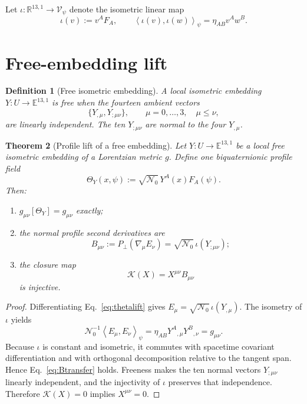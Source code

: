 \documentclass[11pt,a4paper]{article}
\newtheorem{definition}{Definition}[section]
\newtheorem{theorem}[definition]{Theorem}
\theoremstyle{remark}
\newcommand{\Nzero}{\mathcal N_0}
\newcommand{\avg}[1]{\left\langle #1\right\rangle_\psi}
\begin{document}
Let $\iota:\mathbb R^{13,1}\to\mathscr V_\psi$ denote the isometric linear map
\[
 \iota(v):=v^A F_A,
 \qquad
 \avg{\iota(v),\iota(w)}=\eta_{AB}v^Aw^B.
\]

\section{Free-embedding lift}

\begin{definition}[Free isometric embedding]
A local isometric embedding $Y:U\to\mathbb E^{13,1}$ is free when the fourteen
ambient vectors
\begin{equation}
 \{Y_{,\mu},Y_{;\mu\nu}\},
 \qquad \mu=0,\ldots,3,\quad \mu\le\nu,
 \label{eq:freevectors}
\end{equation}
are linearly independent.  The ten $Y_{;\mu\nu}$ are normal to the four
$Y_{,\mu}$.
\end{definition}

\begin{theorem}[Profile lift of a free embedding]
Let $Y:U\to\mathbb E^{13,1}$ be a local free isometric embedding of a
Lorentzian metric $g$.  Define one biquaternionic profile field
\begin{equation}
 \boxed{\quad
 \Theta_Y(x,\psi):=\sqrt{\Nzero}\,Y^A(x)F_A(\psi).
 \quad}
 \label{eq:thetalift}
\end{equation}
Then:
\begin{enumerate}
 \item $g_{\mu\nu}[\Theta_Y]=g_{\mu\nu}$ exactly;
 \item the normal profile second derivatives are
 \begin{equation}
  B_{\mu\nu}
  :=P_\perp(\nabla_\mu E_\nu)
  =\sqrt{\Nzero}\,\iota(Y_{;\mu\nu});
  \label{eq:Btransfer}
 \end{equation}
 \item the closure map
 \begin{equation}
  \mathcal K(X)=X^{\mu\nu}B_{\mu\nu}
  \label{eq:Kmap}
 \end{equation}
 is injective.
\end{enumerate}
\end{theorem}

\begin{proof}
Differentiating Eq.~\eqref{eq:thetalift} gives
$E_\mu=\sqrt{\Nzero}\,\iota(Y_{,\mu})$.  The isometry of $\iota$ yields
\[
 \Nzero^{-1}\avg{E_\mu,E_\nu}
 =\eta_{AB}Y^A{}_{,\mu}Y^B{}_{,\nu}=g_{\mu\nu}.
\]
Because $\iota$ is constant and isometric, it commutes with spacetime
covariant differentiation and with orthogonal decomposition relative to the
tangent span.  Hence Eq.~\eqref{eq:Btransfer} holds.  Freeness makes the ten
normal vectors $Y_{;\mu\nu}$ linearly independent, and the injectivity of
$\iota$ preserves that independence.  Therefore $\mathcal K(X)=0$ implies
$X^{\mu\nu}=0$.
\end{proof}
\end{document}
